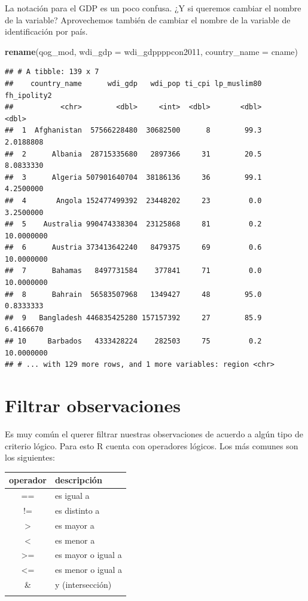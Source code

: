 \documentclass[]{book}
\newenvironment{Shaded}{\begin{snugshade}}{\end{snugshade}}
\newcommand{\KeywordTok}[1]{\textcolor[rgb]{0.13,0.29,0.53}{\textbf{#1}}}
\newcommand{\DataTypeTok}[1]{\textcolor[rgb]{0.13,0.29,0.53}{#1}}
\newcommand{\NormalTok}[1]{#1}
\begin{document}
La notación para el GDP es un poco confusa. ¿Y si queremos cambiar el
nombre de la variable? Aprovechemos también de cambiar el nombre de la
variable de identificación por país.

\begin{Shaded}
\begin{Highlighting}[]
\KeywordTok{rename}\NormalTok{(qog_mod, }\DataTypeTok{wdi_gdp =}\NormalTok{ wdi_gdppppcon2011, }\DataTypeTok{country_name =}\NormalTok{ cname)}
\end{Highlighting}
\end{Shaded}

\begin{verbatim}
## # A tibble: 139 x 7
##    country_name      wdi_gdp   wdi_pop ti_cpi lp_muslim80 fh_ipolity2
##           <chr>        <dbl>     <int>  <dbl>       <dbl>       <dbl>
##  1  Afghanistan  57566228480  30682500      8        99.3   2.0188808
##  2      Albania  28715335680   2897366     31        20.5   8.0833330
##  3      Algeria 507901640704  38186136     36        99.1   4.2500000
##  4       Angola 152477499392  23448202     23         0.0   3.2500000
##  5    Australia 990474338304  23125868     81         0.2  10.0000000
##  6      Austria 373413642240   8479375     69         0.6  10.0000000
##  7      Bahamas   8497731584    377841     71         0.0  10.0000000
##  8      Bahrain  56583507968   1349427     48        95.0   0.8333333
##  9   Bangladesh 446835425280 157157392     27        85.9   6.4166670
## 10     Barbados   4333428224    282503     75         0.2  10.0000000
## # ... with 129 more rows, and 1 more variables: region <chr>
\end{verbatim}

\section{Filtrar observaciones}\label{filtrar-observaciones}

Es muy común el querer filtrar nuestras observaciones de acuerdo a algún
tipo de criterio lógico. Para esto R cuenta con operadores lógicos. Los
más comunes son los siguientes:

\begin{longtable}[]{@{}cl@{}}
\toprule
operador & descripción\tabularnewline
\midrule
\endhead
== & es igual a\tabularnewline
!= & es distinto a\tabularnewline
\textgreater{} & es mayor a\tabularnewline
\textless{} & es menor a\tabularnewline
\textgreater{}= & es mayor o igual a\tabularnewline
\textless{}= & es menor o igual a\tabularnewline
\& & y (intersección)\tabularnewline
&\tabularnewline
\bottomrule
\end{longtable}
\end{document}

